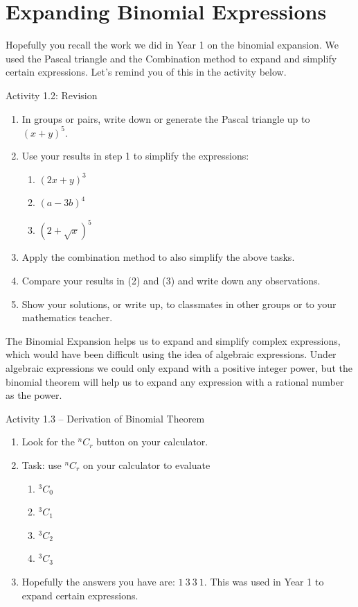 \section{Expanding Binomial Expressions}

Hopefully you recall the work we did in Year 1 on the binomial expansion. We
used the Pascal triangle and the Combination method to expand and simplify
certain expressions. Let's remind you of this in the activity below.

\begin{activity}{Activity 1.2: Revision}
\begin{enumerate}
  \item In groups or pairs, write down or generate the Pascal triangle up to $(x+y)^5$.
  \item Use your results in step 1 to simplify the expressions:
  \begin{enumerate}
    \item[a.] $(2x+y)^3$
    \item[b.] $(a-3b)^4$
    \item[c.] $(2+\sqrt{x})^5$
  \end{enumerate}
  \item Apply the combination method to also simplify the above tasks.
  \item Compare your results in (2) and (3) and write down any observations.
  \item Show your solutions, or write up, to classmates in other groups or to
  your mathematics teacher.
\end{enumerate}
\end{activity}

The Binomial Expansion helps us to expand and simplify complex expressions,
which would have been difficult using the idea of algebraic expressions. Under
algebraic expressions we could only expand with a positive integer power, but the
binomial theorem will help us to expand any expression with a rational number
as the power.

\begin{activity}{Activity 1.3 -- Derivation of Binomial Theorem}
\begin{enumerate}
  \item Look for the $^{n}C_{r}$ button on your calculator.
  \item Task: use $^{n}C_{r}$ on your calculator to evaluate
  \begin{enumerate}
    \item[i)] $^{3}C_{0}$
    \item[ii)] $^{3}C_{1}$
    \item[iii)] $^{3}C_{2}$
    \item[iv)] $^{3}C_{3}$
  \end{enumerate}
  \item Hopefully the answers you have are: $1\ 3\ 3\ 1$. This was used in Year 1 to
  expand certain expressions.
\end{enumerate}
\end{activity}

